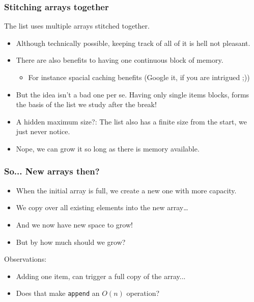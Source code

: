 \begin{frame}
	\frametitle{Stitching arrays together}
		The list uses multiple arrays stitched together.
		\begin{itemize}
			\item Although technically possible, keeping track of all of it is hell not pleasant.
			\item There are also benefits to having one continuous block of memory.
				\begin{itemize}
					\item For instance spacial caching benefits (Google it, if you are intrigued ;))
				\end{itemize}
				
			\item But the idea isn't a bad one per se. Having only single items blocks, forms the basis of the list we study
				after the break!
			\item A hidden maximum size?: 		The list also has a finite size from the start, we just never notice.
			\item Nope, we can grow it so long as there is memory available.
		\end{itemize}
\end{frame}

\begin{frame}
	\frametitle{So... New arrays then?}
			\begin{itemize}
			\item When the initial array is full, we create a new one with more capacity.
			\item We copy over all existing elements into the new array\dots
			\item And we now have new space to grow!
			\item But by how much should we grow?	
			\end{itemize}

	Observations:
		\begin{itemize}
			\item Adding one item, can trigger a full copy of the array...
			\item Does that make \texttt{append} an $O(n)$ operation?
		\end{itemize}
\end{frame}

